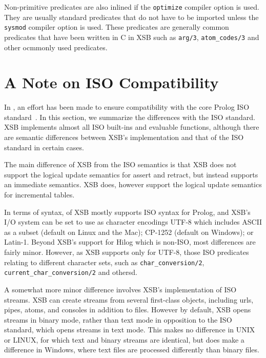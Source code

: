 Non-primitive predicates are also inlined if the {\tt optimize}
compiler option is used.  They are usually standard predicates that do
not have to be imported unless the {\tt sysmod} compiler option is
used.  These predicates are generally common predicates that have been
written in C in XSB such as {\tt arg/3}, {\tt atom\_codes/3} and other
ocmmonly used predicates.

\section{A Note on ISO Compatibility} \label{sec:iso}

In \version, an effort has been made to ensure compatibility with the
core Prolog ISO standard~\cite{ISO-Prolog}.  In this section, we
summarize the differences with the ISO standard.  XSB implements
almost all ISO built-ins and evaluable functions, although there are
semantic differences between XSB's implementation and that of the ISO
standard in certain cases.

The main difference of XSB from the ISO semantics is that XSB does not
support the logical update semantics for assert and retract, but
instead supports an immediate semantics.  XSB does, however support
the logical update semantics for incremental tables.


In terms of syntax, \version{} of XSB mostly supports ISO syntax for
Prolog, and XSB's I/O system can be set to use as character encodings
UTF-8 which includes ASCII as a subset (default on Linux and the Mac);
CP-1252 (default on Windows); or Latin-1.  Beyond XSB's support for
Hilog which is non-ISO, most differences are fairly minor.  However,
as XSB supports only for UTF-8, those ISO predicates relating to
different character sets, such as {\tt char\_conversion/2}, {\tt
  current\_char\_conversion/2} and othersd.

A somewhat more minor difference involves XSB's implementation of ISO
streams.  XSB can create streams from several first-class objects,
including urls, pipes, atoms, and consoles in addition to files.
However by default, XSB opens streams in binary mode, rather than text
mode in opposition to the ISO standard, which opens streams in text
mode.  This makes no difference in UNIX or LINUX, for which text and
binary streams are identical, but does make a difference in Windows,
where text files are processed differently than binary files.

